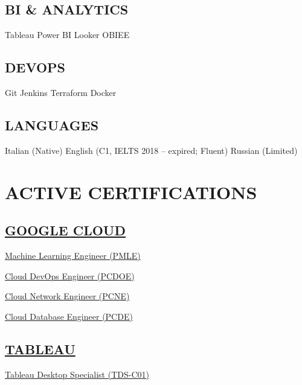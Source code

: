\documentclass[]{deedy-resume-cv}
\begin{document}
\begin{minipage}[t]{0.35\textwidth}
\sectionsep

\subsection{BI \& ANALYTICS}
Tableau \textbullet{} Power BI \textbullet{} Looker \textbullet{} OBIEE

\sectionsep

\subsection{DEVOPS}
Git \textbullet{} Jenkins \textbullet{} Terraform \textbullet{} Docker 

\sectionsep

\subsection{LANGUAGES}
Italian (Native) \textbullet{} English (C1, IELTS 2018 – expired; Fluent) \textbullet{} Russian (Limited)

\section{ACTIVE CERTIFICATIONS}

\subsection{\href{https://cloud.google.com/}{GOOGLE CLOUD}}
\href{https://www.credly.com/badges/b55bbd99-441d-410e-ac38-ca5e7834b8ef/public_url}{Machine Learning Engineer (PMLE)}

\href{https://www.credly.com/badges/c6d15809-9a56-48a9-b1e7-3864cbd76ed2/public_url}{Cloud DevOps Engineer (PCDOE)}

\href{https://www.credly.com/badges/03d9c9f3-04df-4e9b-ba2f-49a3169535cd/public_url}{Cloud Network Engineer (PCNE)}

\href{https://www.credly.com/badges/8f5c5580-3ce9-47b7-9a74-e4bfb8c2cdb8/public_url}{Cloud Database Engineer (PCDE)}

\sectionsep

\subsection{\href{https://www.tableau.com/}{TABLEAU}}
\href{https://www.credly.com/badges/d8a0b29c-ecb0-4f59-b6df-7b3a871f766e}{Tableau Desktop Specialist (TDS-C01)}


\end{minipage}
\end{document}
